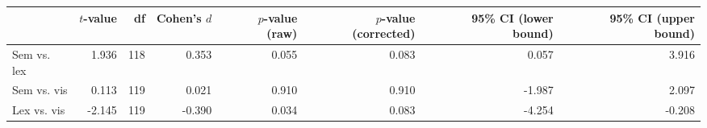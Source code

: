 \begin{tabular}{lrrrrrrr}
\toprule
 & $t$-value & df & Cohen's $d$ & $p$-value (raw) & $p$-value (corrected) & 95\% CI (lower bound) & 95\% CI (upper bound) \\
\midrule
 Sem vs. lex & 1.936 & 118 & 0.353 & 0.055 & 0.083 & 0.057 & 3.916 \\
 Sem vs. vis & 0.113 & 119 & 0.021 & 0.910 & 0.910 & -1.987 & 2.097 \\
\rowcolor[HTML]{f5f5f5} Lex vs. vis & -2.145 & 119 & -0.390 & 0.034 & 0.083 & -4.254 & -0.208 \\
\bottomrule
\end{tabular}